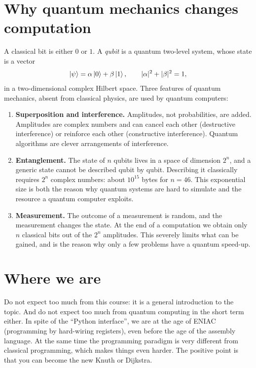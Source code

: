 \section{Why quantum mechanics changes computation}
A classical bit is either $0$ or $1$. A \emph{qubit} is a quantum two-level system, whose state is a vector
\begin{equation}
  \left|\psi\right\rangle=\alpha\left|0\right\rangle+\beta\left|1\right\rangle,\qquad |\alpha|^2+|\beta|^2=1,
\end{equation}
in a two-dimensional complex Hilbert space. Three features of quantum mechanics, absent from classical
physics, are used by quantum computers:
\begin{enumerate}
  \item \textbf{Superposition and interference.} Amplitudes, not probabilities, are added. Amplitudes are complex
  numbers and can cancel each other (destructive interference) or reinforce each other (constructive interference).
  Quantum algorithms are clever arrangements of interference.
  \item \textbf{Entanglement.} The state of $n$ qubits lives in a space of dimension $2^n$, and a generic state cannot be
  described qubit by qubit. Describing it classically requires $2^n$ complex numbers: about $10^{15}$ bytes for $n=46$.
  This exponential size is both the reason why quantum systems are hard to simulate and the resource a quantum computer exploits.
  \item \textbf{Measurement.} The outcome of a measurement is random, and the measurement changes the state.
  At the end of a computation we obtain only $n$ classical bits out of the $2^n$ amplitudes. This severely limits
  what can be gained, and is the reason why only a few problems have a quantum speed-up.
\end{enumerate}

\section{Where we are}
Do not expect too much from this course: it is a general introduction to the topic. And do not expect too much from
quantum computing in the short term either. In spite of the ``Python interface'', we are at the age of ENIAC
(programming by hard-wiring registers), even before the age of the assembly language. At the same time the programming
paradigm is very different from classical programming, which makes things even harder. The positive point is that you can
become the new Knuth or Dijkstra.

